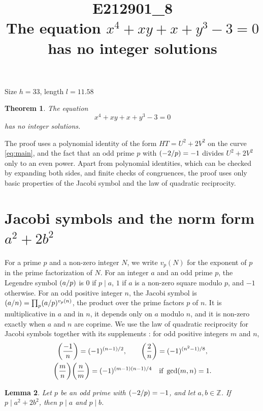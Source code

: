 \documentclass[11pt]{article}
\title{\textbf{E212901\_8}\\[4pt] {\Large The equation $x^{4}+xy+x+y^{3}-3=0$ has no integer solutions}}
\author{}
\date{}
\newtheorem{theorem}{Theorem}
\newtheorem{lemma}[theorem]{Lemma}
\newcommand{\Z}{\mathbb{Z}}
\newcommand{\leg}[2]{\mathchoice{\biggl(\dfrac{#1}{#2}\biggr)}{(#1/#2)}{(#1/#2)}{(#1/#2)}}
\begin{document}
\maketitle
\vspace{-8ex}
\begin{center}
Size $h=33$, length $l=11.58$
\end{center}

\begin{theorem}\label{thm:main}
The equation
\begin{equation}\label{eq:main}
x^{4}+xy+x+y^{3}-3=0
\end{equation}
has no integer solutions.
\end{theorem}

The proof uses a polynomial identity of the form $HT=U^2+2V^2$ on the curve \eqref{eq:main}, and the fact that an odd prime $p$ with $\leg{-2}{p}=-1$ divides $U^2+2V^2$ only to an even power. Apart from polynomial identities, which can be checked by expanding both sides, and finite checks of congruences, the proof uses only basic properties of the Jacobi symbol and the law of quadratic reciprocity.

\section{\texorpdfstring{Jacobi symbols and the norm form $a^2+2b^2$}{Jacobi symbols and the norm form}}

For a prime $p$ and a non-zero integer $N$, we write $v_p(N)$ for the exponent of $p$ in the prime factorization of $N$. For an integer $a$ and an odd prime $p$, the Legendre symbol $\leg{a}{p}$ is $0$ if $p\mid a$, $1$ if $a$ is a non-zero square modulo $p$, and $-1$ otherwise. For an odd positive integer $n$, the Jacobi symbol is $\leg{a}{n}=\prod_p\leg{a}{p}^{v_p(n)}$, the product over the prime factors $p$ of $n$. It is multiplicative in $a$ and in $n$, it depends only on $a$ modulo $n$, and it is non-zero exactly when $a$ and $n$ are coprime. We use the law of quadratic reciprocity for Jacobi symbols together with its supplements \cite[Chapter~5, \S2]{IR}: for odd positive integers $m$ and $n$,
\begin{gather*}
\leg{-1}{n}=(-1)^{(n-1)/2},\qquad\leg{2}{n}=(-1)^{(n^2-1)/8},\\
\leg{m}{n}\leg{n}{m}=(-1)^{(m-1)(n-1)/4}\quad\text{if }\gcd(m,n)=1.
\end{gather*}

\begin{lemma}\label{lem:divides}
Let $p$ be an odd prime with $\leg{-2}{p}=-1$, and let $a,b\in\Z$. If $p\mid a^2+2b^2$, then $p\mid a$ and $p\mid b$.
\end{lemma}
\end{document}
